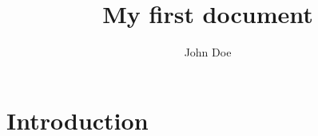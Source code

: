 \documentclass{article}
\title{My first document}
\author{John Doe}
\begin{document}
	\maketitle
	\section{Introduction}
\end{document}
